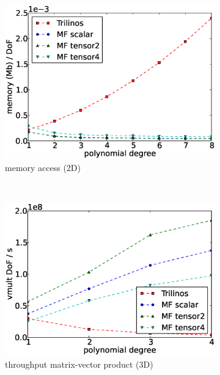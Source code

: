 \documentclass[AMA,STIX1COL]{WileyNJD-v2}
\begin{document}
\begin{figure}
\begin{subfigure}[b]{0.32\textwidth}
      \includegraphics[width=\textwidth]{IWR_newest_patched_memory2d.eps}
      \caption{memory access (2D)}
      \label{fig:benchmark_miehe_IWR_memory2}
  \end{subfigure}
  ~
  \begin{subfigure}[b]{0.32\textwidth}
    \centering
    \includegraphics[width=\textwidth]{IWR_newest_patched_throughput3d.eps}
    \caption{throughput matrix-vector product (3D)}
  \end{subfigure}
  \begin{subfigure}[b]{0.32\textwidth}
    \centering

\end{subfigure}
\end{figure}
\end{document}
